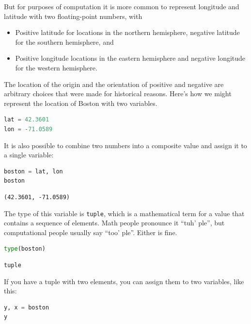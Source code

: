 But for purposes of computation it is more common to represent longitude
and latitude with two floating-point numbers, with

\begin{itemize}
\item
  Positive latitude for locations in the northern hemisphere, negative
  latitude for the southern hemisphere, and
\item
  Positive longitude locations in the eastern hemisphere and negative
  longitude for the western hemisphere.
\end{itemize}

The location of the origin and the orientation of positive and negative
are arbitrary choices that were made for historical reasons. Here's how
we might represent the location of Boston with two variables.

\begin{lstlisting}[language=Python,style=source]
lat = 42.3601
lon = -71.0589
\end{lstlisting}

It is also possible to combine two numbers into a composite value and
assign it to a single variable:

\begin{lstlisting}[language=Python,style=source]
boston = lat, lon
boston
\end{lstlisting}

\begin{lstlisting}[style=output]
(42.3601, -71.0589)
\end{lstlisting}

The type of this variable is \passthrough{\lstinline!tuple!}, which is a
mathematical term for a value that contains a sequence of elements. Math
people pronounce it ``tuh' ple'', but computational people usually say
``too' ple''. Either is fine.

\begin{lstlisting}[language=Python,style=source]
type(boston)
\end{lstlisting}

\begin{lstlisting}[style=output]
tuple
\end{lstlisting}

If you have a tuple with two elements, you can assign them to two
variables, like this:

\begin{lstlisting}[language=Python,style=source]
y, x = boston
y
\end{lstlisting}

